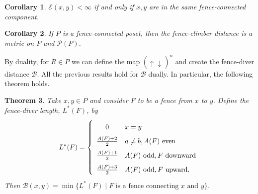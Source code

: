 \documentclass{article}[12pt]
\theoremstyle{exampstyle}
\newtheorem{theorem}{Theorem}[section]
\newtheorem{corollary}[theorem]{Corollary}
\newtheorem{definition}[theorem]{Definition}
\theoremstyle{remark}
\newcommand{\N}{\mathbb{N}}
\newcommand{\B}{\mathcal{B}}
\newcommand{\E}{\mathcal{E}}
\renewcommand{\P}{\mathcal{P}}
\newcommand{\downup}[1][]{ \uparrow_{#1} \downarrow_{#1}}
\newcommand{\End}{\text{End}}
\newcommand{\seq}[3][]{(#2_{#3})_{#1}}
\begin{document}




\begin{corollary}
    $\E(x,y) < \infty$ if and only if $x,y$ are in the same fence-connected component.
    \label{coro_finite_if_connected}
\end{corollary}

\begin{corollary}
    If $P$ is a fence-connected poset, then the fence-climber distance is a metric on $P$ and $\P(P)$.
    \label{coro:fence_metric}
\end{corollary}

 By duality, for $R \in P$ we can define the map $(\downup)^n$  and create the fence-diver distance $\B$. All the previous results hold for $\B$ dually. In particular, the following theorem holds.
 
\begin{theorem}
   Take $x,y \in P$ and consider $F$ to be a fence from $x$ to $y$. Define the fence-diver length, $L^*(F)$, by 
        \begin{equation*}
        L^*(F) = \left\{ 
        \def\arraystretch{1.7}
        \begin{array}{cl}
            0 & x=y \\
            \frac{A(F) +2}{2} & a \neq b,  A(F) \text{ even} \\
            \frac{A(F) +1}{2} & A(F) \text{ odd}, F \text{ downward}\\
            \frac{A(F) +3}{2} & A(F) \text{ odd}, F \text{ upward}.
        \end{array}
        \right.
    \end{equation*}
    Then $\B(x,y)  = \min \{ L^*(F) \mid F \text { is a fence connecting } x \text{ and } y\} $. 
    \label{th_B_is_metric}
\end{theorem}
\end{document}
